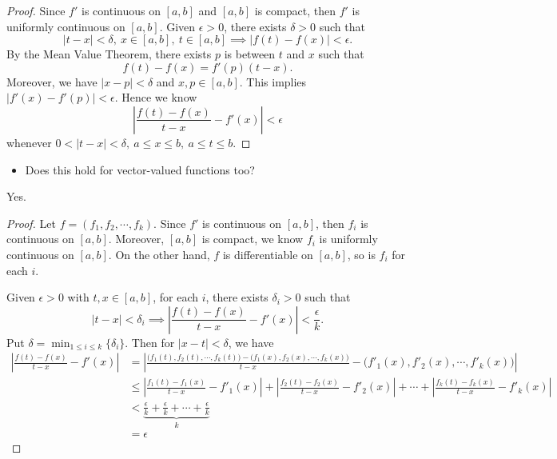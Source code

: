 \begin{Exercise}
	\begin{proof}
		Since $f'$ is continuous on $[a,b]$ and $[a,b]$ is compact, then $f'$ is uniformly continuous on $[a,b]$.
		Given $\epsilon>0$, there exists $\delta > 0$ such that
		$$
		|t-x|<\delta,\ x\in[a,b],\ t\in[a,b] \implies |f(t)-f(x)|<\epsilon.
		$$
		By the Mean Value Theorem, there exists $p$ is between $t$ and $x$ such that
		$$
		f(t)-f(x) = f'(p) (t-x).
		$$
		Moreover, we have $|x-p|<\delta$ and $x,p\in [a,b]$.
		This implies $|f'(x) - f'(p)|<\epsilon$.
		Hence we know
		$$
		\left| \frac{f(t)-f(x)}{t-x}-f'(x) \right| < \epsilon
		$$
		whenever $0<|t-x|<\delta,\ a\leq x \leq b,\ a\leq t\leq b$. 
	\end{proof}
	
	\begin{itemize}
		\item Does this hold for vector-valued functions too?
	\end{itemize}
	\begin{answer}
		Yes.
	\end{answer}
	\begin{proof}
		Let $f = (f_1, f_2, \cdots, f_k)$.
		Since $f'$ is continuous on $[a,b]$, then $f_i$ is continuous on $[a,b]$.
		Moreover, $[a,b]$ is compact, we know $f_i$ is uniformly continuous on $[a,b]$.
		On the other hand, $f$ is differentiable on $[a,b]$, so is $f_i$ for each $i$.
		
		Given $\epsilon>0$ with $t,x\in [a,b]$, for each $i$, there exists $\delta_i >0$ such that
		$$
		|t-x|<\delta_i \implies \left| \frac{f(t)-f(x)}{t-x}-f'(x) \right| < \frac{\epsilon}{k}. 
		$$
		Put $\delta = \min_{1\leq i \leq k}\{\delta_i\}$. Then for $|x-t|<\delta$, we have
		\begin{align*}
		\left| \frac{f(t)-f(x)}{t-x}-f'(x) \right| 
		&= \left| \frac{\big( f_1(t), f_2(t),\cdots, f_k(t)\big) - \big( f_1(x), f_2(x),\cdots, f_k(x)\big)}{t-x} - \big( f'_1(x), f'_2(x), \cdots, f'_k(x) \big)\right| \\
		&\leq \left| \frac{f_1(t)-f_1(x)}{t-x}-f'_1(x) \right| + \left| \frac{f_2(t)-f_2(x)}{t-x}-f'_2(x) \right| + \cdots + \left| \frac{f_k(t)-f_k(x)}{t-x}-f'_k(x) \right| \\
		&< \underbrace{ \frac{\epsilon}{k} + \frac{\epsilon}{k} + \cdots +  \frac{\epsilon}{k}  }_k \\
		&= \epsilon
		\end{align*}
	\end{proof}
\end{Exercise}